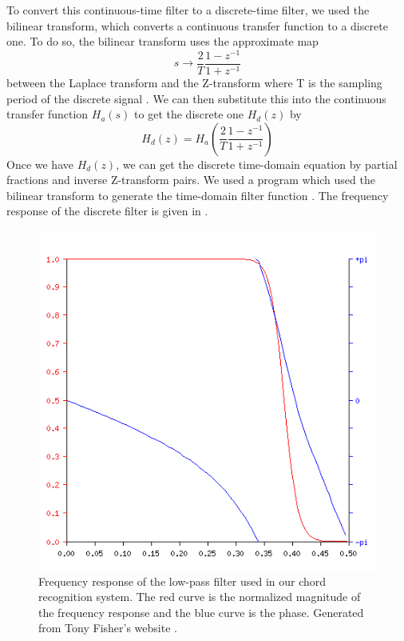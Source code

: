 \documentclass[journal]{IEEEtran}
\begin{document}
To convert this continuous-time filter to a discrete-time filter, we used the bilinear transform, which converts a continuous transfer function to a discrete one.
To do so, the bilinear transform uses the approximate map
\begin{equation}
    s \to \frac{2}{T}\frac{1 - z^{-1}}{1 + z^{-1}}
    \label{eq:s_to_z}
\end{equation}
between the Laplace transform and the Z-transform where T is the sampling period of the discrete signal \cite{proakis}.
We can then substitute this into the continuous transfer function $H_a(s)$ to get the discrete one $H_d(z)$ by 
\begin{equation}
    H_d(z) = H_a\!\left(\frac{2}{T}\frac{1 - z^{-1}}{1 + z^{-1}}\right)
    \label{eq:bilinear}
\end{equation}
Once we have $H_d(z)$, we can get the discrete time-domain equation by partial fractions and inverse Z-transform pairs.
We used a program which used the bilinear transform to generate the time-domain filter function \cite{filter}.
The frequency response of the discrete filter is given in .

\begin{figure}[t]
    \centering
    \includegraphics[width=\linewidth]{../Figures/frequency_response}
    \caption{Frequency response of the low-pass filter used in our chord recognition system.
    The red curve is the normalized magnitude of the frequency response and the blue curve is the phase.
    Generated from Tony Fisher's website \cite{filter}.}
    \label{fig:frequency_response}
\end{figure}
\end{document}

